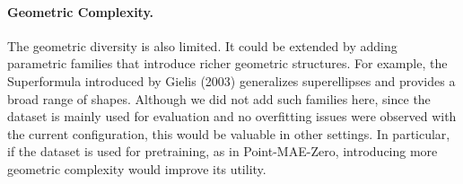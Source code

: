 \paragraph{Geometric Complexity.} The geometric diversity is also limited. It could be extended by adding parametric families that introduce richer geometric structures. For example, the Superformula introduced by Gielis (2003) \cite{superformula} generalizes superellipses and provides a broad range of shapes. Although we did not add such families here, since the dataset is mainly used for evaluation and no overfitting issues were observed with the current configuration, this would be valuable in other settings. In particular, if the dataset is used for pretraining, as in Point-MAE-Zero, introducing more geometric complexity would improve its utility.


